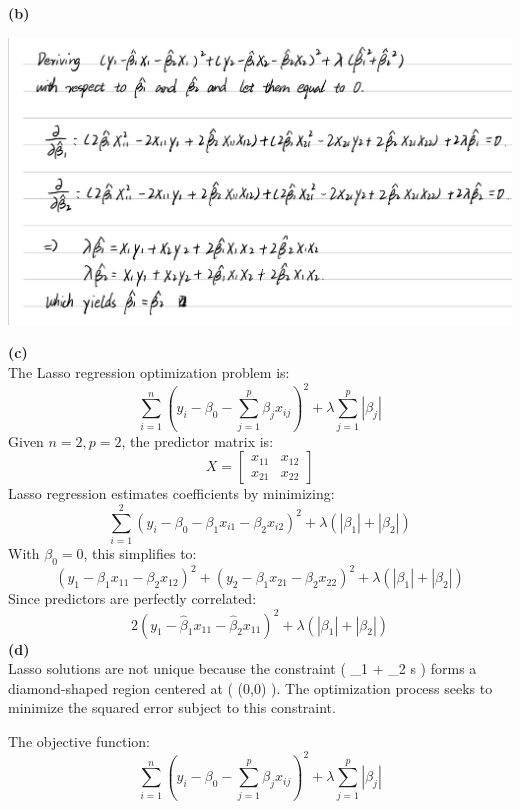 \documentclass[
  letterpaper,
  DIV=11,
  numbers=noendperiod]{scrartcl}
\begin{document}
\textbf{(b)}

\begin{center}
\includegraphics{IMG_274FE6CD7017-1.jpeg}
\end{center}

\textbf{(c)}\\
The Lasso regression optimization problem is:\\
\[
\sum_{i=1}^{n} \left( y_i - \beta_0 - \sum_{j=1}^{p} \beta_j x_{ij} \right)^2 + \lambda \sum_{j=1}^{p} |\beta_j|
\] Given \(n = 2, p = 2\), the predictor matrix is:\\
\[
X = \begin{bmatrix} x_{11} & x_{12} \\ x_{21} & x_{22} \end{bmatrix}
\] Lasso regression estimates coefficients by minimizing:\\
\[
\sum_{i=1}^{2} \left( y_i - \beta_0 - \beta_1 x_{i1} - \beta_2 x_{i2} \right)^2 + \lambda (|\beta_1| + |\beta_2|)
\] With \(\beta_0 = 0\), this simplifies to:\\
\[
(y_1 - \beta_1 x_{11} - \beta_2 x_{12})^2 + (y_2 - \beta_1 x_{21} - \beta_2 x_{22})^2 + \lambda (|\beta_1| + |\beta_2|)
\] Since predictors are perfectly correlated:\\
\[
2(y_1 - \hat{\beta}_1 x_{11} - \hat{\beta}_2 x_{11})^2 + \lambda (|\beta_1| + |\beta_2|)
\] \textbf{(d)}\\
Lasso solutions are not unique because the constraint (
\textbar{}\hat{\beta}\_1\textbar{} + \textbar{}\hat{\beta}\_2\textbar{}
\leq s ) forms a diamond-shaped region centered at ( (0,0) ). The
optimization process seeks to minimize the squared error subject to this
constraint.

The objective function: \[
\sum_{i=1}^{n} \left( y_i - \beta_0 - \sum_{j=1}^{p} \beta_j x_{ij} \right)^2 + \lambda \sum_{j=1}^{p} |\beta_j|
\]
\end{document}
